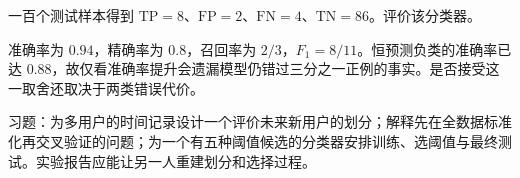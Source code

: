 \begin{example}[准确率与召回率]
一百个测试样本得到 $\mathrm{TP}=8$、$\mathrm{FP}=2$、$\mathrm{FN}=4$、$\mathrm{TN}=86$。评价该分类器。
\end{example}
\begin{solve}
准确率为 $0.94$，精确率为 $0.8$，召回率为 $2/3$，$F_1=8/11$。恒预测负类的准确率已达 $0.88$，故仅看准确率提升会遗漏模型仍错过三分之一正例的事实。是否接受这一取舍还取决于两类错误代价。
\end{solve}

习题：为多用户的时间记录设计一个评价未来新用户的划分；解释先在全数据标准化再交叉验证的问题；为一个有五种阈值候选的分类器安排训练、选阈值与最终测试。实验报告应能让另一人重建划分和选择过程。





